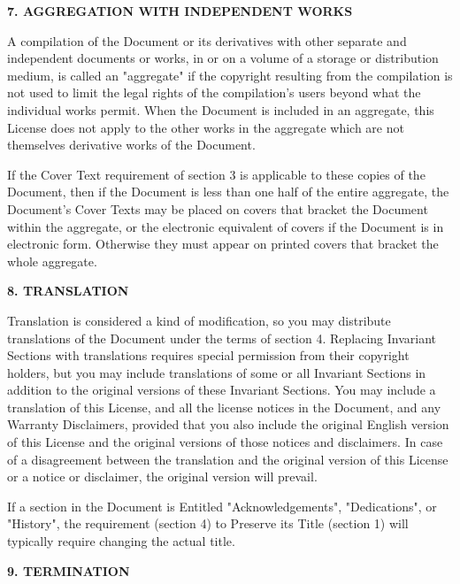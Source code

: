 \documentclass[a4paper,11pt]{article}
\begin{document}
\begin{center}
{\Large\bf 7. AGGREGATION WITH INDEPENDENT WORKS}
\end{center}


A compilation of the Document or its derivatives with other separate
and independent documents or works, in or on a volume of a storage or
distribution medium, is called an "aggregate" if the copyright
resulting from the compilation is not used to limit the legal rights
of the compilation's users beyond what the individual works permit.
When the Document is included in an aggregate, this License does not
apply to the other works in the aggregate which are not themselves
derivative works of the Document.

If the Cover Text requirement of section 3 is applicable to these
copies of the Document, then if the Document is less than one half of
the entire aggregate, the Document's Cover Texts may be placed on
covers that bracket the Document within the aggregate, or the
electronic equivalent of covers if the Document is in electronic form.
Otherwise they must appear on printed covers that bracket the whole
aggregate.


\begin{center}
{\Large\bf 8. TRANSLATION}
\end{center}


Translation is considered a kind of modification, so you may
distribute translations of the Document under the terms of section 4.
Replacing Invariant Sections with translations requires special
permission from their copyright holders, but you may include
translations of some or all Invariant Sections in addition to the
original versions of these Invariant Sections.  You may include a
translation of this License, and all the license notices in the
Document, and any Warranty Disclaimers, provided that you also include
the original English version of this License and the original versions
of those notices and disclaimers.  In case of a disagreement between
the translation and the original version of this License or a notice
or disclaimer, the original version will prevail.

If a section in the Document is Entitled "Acknowledgements",
"Dedications", or "History", the requirement (section 4) to Preserve
its Title (section 1) will typically require changing the actual
title.


\begin{center}
{\Large\bf 9. TERMINATION}
\end{center}
\end{document}
